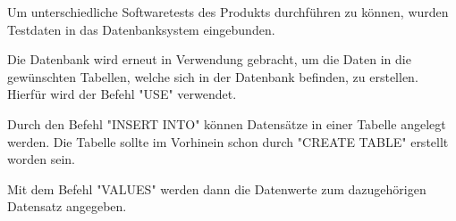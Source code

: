 
Um unterschiedliche Softwaretests des Produkts durchführen zu können, wurden Testdaten in das Datenbanksystem eingebunden.

Die Datenbank wird erneut in Verwendung gebracht, um die Daten in die gewünschten Tabellen, welche sich in der Datenbank befinden, zu erstellen. Hierfür wird der Befehl "USE" verwendet.


Durch den Befehl "INSERT INTO" können Datensätze in einer Tabelle angelegt werden. Die Tabelle sollte im Vorhinein schon durch "CREATE TABLE" erstellt worden sein.


Mit dem Befehl "VALUES" werden dann die Datenwerte zum dazugehörigen Datensatz angegeben.




